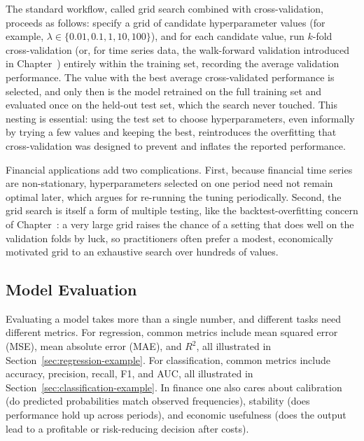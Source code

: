 \documentclass[../ai_in_finance]{subfiles}
\begin{document}
The standard workflow, called grid search combined with cross-validation, proceeds as follows: specify a grid of candidate hyperparameter values (for example, $\lambda \in \{0.01, 0.1, 1, 10, 100\}$), and for each candidate value, run $k$-fold cross-validation (or, for time series data, the walk-forward validation introduced in Chapter~) entirely within the training set, recording the average validation performance. The value with the best average cross-validated performance is selected, and only then is the model retrained on the full training set and evaluated once on the held-out test set, which the search never touched. This nesting is essential: using the test set to choose hyperparameters, even informally by trying a few values and keeping the best, reintroduces the overfitting that cross-validation was designed to prevent and inflates the reported performance.

Financial applications add two complications. First, because financial time series are non-stationary, hyperparameters selected on one period need not remain optimal later, which argues for re-running the tuning periodically. Second, the grid search is itself a form of multiple testing, like the backtest-overfitting concern of Chapter~: a very large grid raises the chance of a setting that does well on the validation folds by luck, so practitioners often prefer a modest, economically motivated grid to an exhaustive search over hundreds of values.

\subsection{Model Evaluation}
\label{sec:ml-model-evaluation}

Evaluating a model takes more than a single number, and different tasks need different metrics. For regression, common metrics include mean squared error (MSE), mean absolute error (MAE), and $R^2$, all illustrated in Section~\ref{sec:regression-example}. For classification, common metrics include accuracy, precision, recall, F1, and AUC, all illustrated in Section~\ref{sec:classification-example}. In finance one also cares about calibration (do predicted probabilities match observed frequencies), stability (does performance hold up across periods), and economic usefulness (does the output lead to a profitable or risk-reducing decision after costs).
\end{document}

